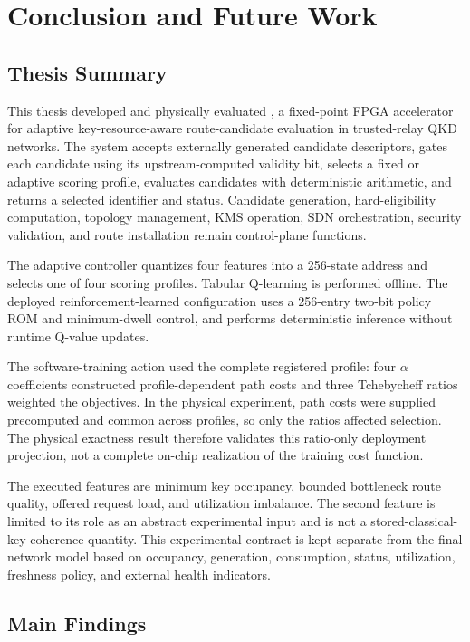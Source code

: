 \chapter{Conclusion and Future Work}
\label{chap:conclusion}

\section{Thesis Summary}

This thesis developed and physically evaluated \QFlow, a fixed-point FPGA
accelerator for adaptive key-resource-aware route-candidate evaluation in
trusted-relay QKD networks. The system accepts externally generated candidate
descriptors, gates each candidate using its upstream-computed validity bit, selects
a fixed or adaptive scoring profile, evaluates candidates with deterministic
arithmetic, and returns a selected identifier and status. Candidate generation,
hard-eligibility computation, topology management, KMS operation, SDN orchestration,
security validation, and route installation remain control-plane functions.

The adaptive controller quantizes four features into a 256-state address and selects
one of four scoring profiles. Tabular Q-learning is performed offline. The deployed
reinforcement-learned configuration uses a 256-entry two-bit policy ROM and
minimum-dwell control, and performs deterministic inference without runtime Q-value
updates.

The software-training action used the complete registered profile: four $\alpha$
coefficients constructed profile-dependent path costs and three Tchebycheff ratios
weighted the objectives. In the physical experiment, path costs were supplied
precomputed and common across profiles, so only the ratios affected selection. The
physical exactness result therefore validates this ratio-only deployment projection,
not a complete on-chip realization of the training cost function.

The executed features are minimum key occupancy, bounded bottleneck route quality,
offered request load, and utilization imbalance. The second feature is limited to
its role as an abstract experimental input and is not a stored-classical-key
coherence quantity. This experimental contract is kept separate from the final
network model based on occupancy, generation, consumption, status, utilization,
freshness policy, and external health indicators.

\section{Main Findings}

